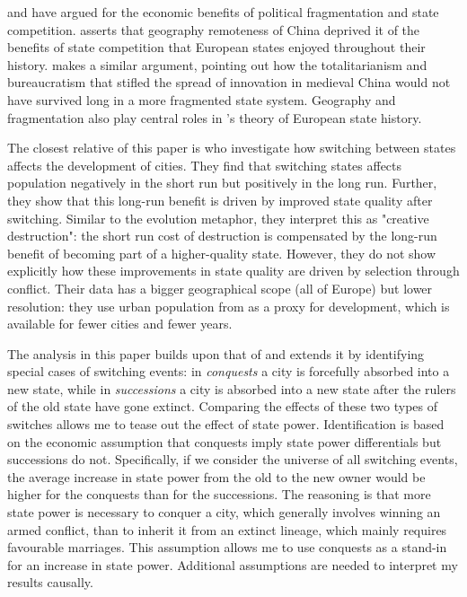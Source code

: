 \documentclass[11pt, a4paper]{article}
\begin{document}
\cite{diamond1997} and \cite{landes1969, landes2006} have argued for the economic benefits of political fragmentation and state competition. \cite{diamond1997} asserts that geography 
remoteness of China deprived it of the benefits of state competition that European states enjoyed throughout their history. \cite{landes2006} makes a similar argument, pointing out how the totalitarianism and bureaucratism that stifled the spread of innovation in medieval China would not have survived long in a more fragmented state system. Geography and fragmentation also play central roles in \cite{cervellati2022}'s theory of European state history.

The closest relative of this paper is \cite{schoenholzer2022} who investigate how switching between states affects the development of cities. They find that switching states affects population negatively in the short run but positively in the long run. Further, they show that this long-run benefit is driven by improved state quality after switching. Similar to the evolution metaphor, they interpret this as "creative destruction": the short run cost of destruction is compensated by the long-run benefit of becoming part of a higher-quality state. However, they do not show explicitly how these improvements in state quality are driven by selection through conflict. Their data has a bigger geographical scope (all of Europe) but lower resolution: they use urban population from \cite{bairoch1988} as a proxy for development, which is available for fewer cities and fewer years.

The analysis in this paper builds upon that of \cite{schoenholzer2022} and extends it by identifying special cases of switching events: in \textit{conquests} a city is forcefully absorbed into a new state, while in \textit{successions} a city is absorbed into a new state after the rulers of the old state have gone extinct. Comparing the effects of these two types of switches allows me to tease out the effect of state power. Identification is based on the economic assumption that conquests imply state power differentials but successions do not. Specifically, if we consider the universe of all switching events, the average increase in state power from the old to the new owner would be higher for the conquests than for the successions. The reasoning is that more state power is necessary to conquer a city, which generally involves winning an armed conflict, than to inherit it from an extinct lineage, which mainly requires favourable marriages. This assumption allows me to use conquests as a stand-in for an increase in state power. Additional assumptions are needed to interpret my results causally.
\end{document}
